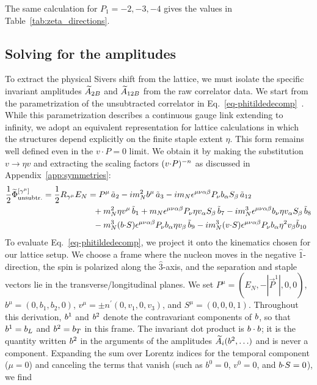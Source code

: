 \begin{widetext}
The same calculation for $P_1=-2,-3,-4$ gives the values in Table~\ref{tab:zeta_directions}.


\subsection{Solving for the amplitudes}
\label{app:solve}
To extract the physical Sivers shift from the lattice, we must isolate the specific invariant amplitudes $\widetilde{A}_{2B}$ and $\widetilde{A}_{12B}$ from the raw correlator data. We start from the parametrization of the unsubtracted correlator in Eq.~\eqref{eq-phitildedecomp}~\cite{Musch:2011er}. While this parametrization describes a continuous gauge link extending to infinity, we adopt an equivalent representation for lattice calculations in which the structures depend explicitly on the finite staple extent $\eta$. This form remains well defined even in the $v \cdot P = 0$ limit. We obtain it by making the substitution $v \rightarrow \eta v$ and extracting the scaling factors $(v {\cdot} P)^{-n}$ as discussed in Appendix~\ref{app:symmetries}:
 \begin{align}
    \frac{1}{2}\widetilde \Phi^{[\gamma^\mu]}_{\text{unsubtr.}}=\frac{1}{2} R_{\gamma^{\mu}} E_N & =  
		P^\mu\, \tilde a_2 - i m_N^2 b^\mu\, \tilde a_3
		- i m_N \epsilon^{\mu \nu \alpha \beta} P_\nu b_\alpha S_\beta\, \tilde a_{12} \nonumber \\ &
		~~+ m_N^2 \eta v^\mu\, \tilde b_1 
		+ m_N \epsilon^{\mu \nu \alpha \beta} P_\nu \eta v_\alpha S_\beta\, \tilde b_7  
		-  i m_N^3 \epsilon^{\mu \nu \alpha \beta} b_\nu \eta v_\alpha S_\beta\, \tilde b_8 \nonumber \\ &
		~~- m_N^3 (b {\cdot} S) \epsilon^{\mu \nu \alpha \beta} P_\nu b_\alpha \eta v_\beta\, \tilde b_9
		-i m_N^3 (v {\cdot} S) \epsilon^{\mu \nu \alpha \beta} P_\nu b_\alpha \eta^2 v_\beta \tilde b_{10}
\end{align}
To evaluate Eq.~\eqref{eq-phitildedecomp}, we project it onto the kinematics chosen for our lattice setup. We choose a frame where the nucleon moves in the negative $\hat{1}$-direction, the spin is polarized along the $\hat{3}$-axis, and the separation and staple vectors lie in the transverse/longitudinal planes. We set $P^{\mu}=(E_N, -|\vec{P}^1|,0,0)$, $b^{\mu}=(0,b_{1},b_{2},0)$, $v^{\mu}=\pm n^{\prime}(0,v_{1},0,v_{3})$, and $S^{\mu}=(0,0,0,1)$. Throughout this derivation, $b^1$ and $b^2$ denote the contravariant components of $b$, so that $b^1=b_L$ and $b^2=b_T$ in this frame. The invariant dot product is $b\cdot b$; it is the quantity written $b^2$ in the arguments of the amplitudes $\widetilde{A}_i(b^2,\ldots)$ and is never a component. Expanding the sum over Lorentz indices for the temporal component ($\mu = 0$) and canceling the terms that vanish (such as $b^0 = 0$, $v^0 = 0$, and $b {\cdot} S = 0$), we find %

\end{widetext}
